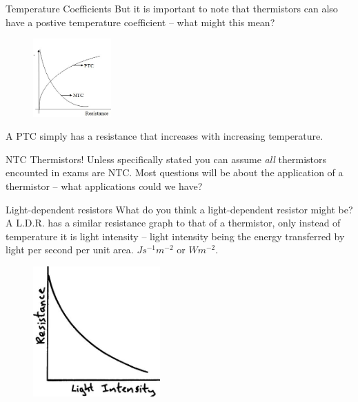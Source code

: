 \documentclass[../Main.tex]{subfiles}
\begin{document}
\begin{frame}{Temperature Coefficients}
    But it is important to note that thermistors can also have a postive temperature coefficient -- what might this mean? \pause
    \begin{figure}
        \centering
        \includegraphics[height=3cm]{Electricity_Images/ptc_thermistor.jpg}
    \end{figure}
    A PTC simply has a resistance that increases with increasing temperature.

    \begin{alertblock}{NTC Thermistors!}
Unless specifically stated you can assume \emph{all} thermistors encounted in exams are NTC. Most questions will be about the application of a thermistor -- what applications could we have?
    \end{alertblock}
\end{frame}

\begin{frame}{Light-dependent resistors}
What do you think a light-dependent resistor might be? \pause
\newline \newline
    A L.D.R. has a similar resistance graph to that of a thermistor, only instead of temperature it is light intensity -- light intensity being the energy transferred by light per second per unit area. $Js^{-1}m^{-2}$ or $Wm^{-2}$.
    
    \begin{figure}
        \centering
        \includegraphics[height=5cm]{Electricity_Images/ldr.jpg}
    \end{figure}
\end{frame}
\end{document}
